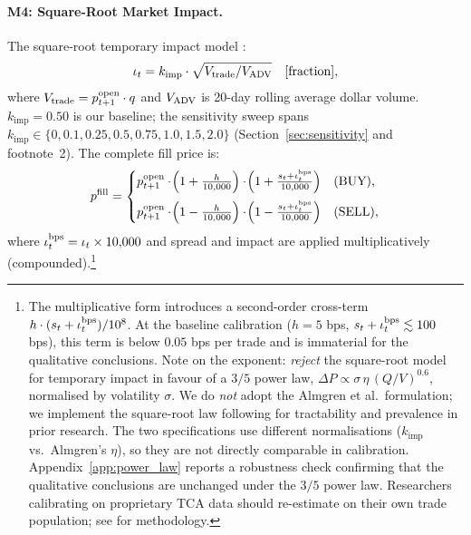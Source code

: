 \documentclass[12pt]{article}
\newcommand{\kimp}{k_{\mathrm{imp}}}
\begin{document}
\paragraph{M4: Square-Root Market Impact.}
The square-root temporary impact model \citep{lillo2003master,bouchaud2009theory}:
\begin{equation}
  \iota_t = \kimp \cdot \sqrt{V_{\rm trade}/V_{\rm ADV}}
  \quad [\text{fraction}],
  \label{eq:impact}
\end{equation}
where $V_{\rm trade} = p^{\rm open}_{t+1} \cdot q$ and $V_{\rm ADV}$
is 20-day rolling average dollar volume. $\kimp = 0.50$ is our baseline; the sensitivity sweep
spans $\kimp \in \{0, 0.1, 0.25, 0.5, 0.75, 1.0, 1.5, 2.0\}$
(Section~\ref{sec:sensitivity} and footnote~2).
The complete fill price is:
\begin{equation}
  p^{\rm fill} =
  \begin{cases}
    p^{\rm open}_{t+1}
      \cdot\!\left(1 + \frac{h}{10{,}000}\right)
      \cdot\!\left(1 + \frac{s_t + \iota_t^{\rm bps}}{10{,}000}\right)
    & \text{(BUY),}\\[8pt]
    p^{\rm open}_{t+1}
      \cdot\!\left(1 - \frac{h}{10{,}000}\right)
      \cdot\!\left(1 - \frac{s_t + \iota_t^{\rm bps}}{10{,}000}\right)
    & \text{(SELL),}
  \end{cases}
  \label{eq:fill}
\end{equation}
where $\iota_t^{\rm bps} = \iota_t \times 10{,}000$ and spread and
impact are applied multiplicatively (compounded).\footnote{%
The multiplicative form introduces a second-order cross-term
$h \cdot (s_t+\iota_t^{\rm bps})/10^8$. At the baseline calibration
($h=5$ bps, $s_t+\iota_t^{\rm bps}\lesssim 100$ bps), this term is
below $0.05$ bps per trade and is immaterial for the qualitative
conclusions.
Note on the exponent: \citet{almgren2005direct} \emph{reject}
the square-root model for temporary impact in favour of a $3/5$ power law,
$\Delta P \propto \sigma\,\eta\,(Q/V)^{0.6}$, normalised by
volatility $\sigma$. We do \emph{not} adopt the Almgren et al.\ formulation;
we implement the square-root law following \citet{lillo2003master} for
tractability and prevalence in prior research. The two specifications use
different normalisations ($\kimp$ vs.\ Almgren's $\eta$), so they are not
directly comparable in calibration.
Appendix~\ref{app:power_law} reports a robustness check confirming that
the qualitative conclusions are unchanged under the $3/5$ power law.
Researchers calibrating on proprietary TCA data should re-estimate
on their own trade population; see \citet{lillo2003master} for methodology.}
\end{document}
